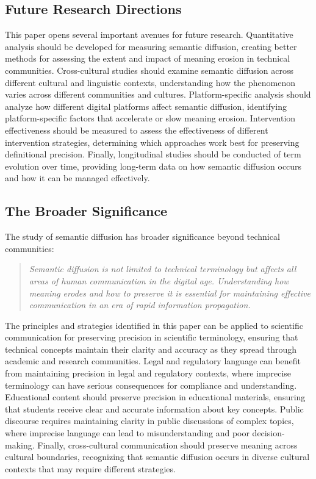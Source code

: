 \documentclass[11pt]{article}
\begin{document}
\subsection{Future Research Directions}

This paper opens several important avenues for future research. Quantitative analysis should be developed for measuring semantic diffusion, creating better methods for assessing the extent and impact of meaning erosion in technical communities. Cross-cultural studies should examine semantic diffusion across different cultural and linguistic contexts, understanding how the phenomenon varies across different communities and cultures. Platform-specific analysis should analyze how different digital platforms affect semantic diffusion, identifying platform-specific factors that accelerate or slow meaning erosion. Intervention effectiveness should be measured to assess the effectiveness of different intervention strategies, determining which approaches work best for preserving definitional precision. Finally, longitudinal studies should be conducted of term evolution over time, providing long-term data on how semantic diffusion occurs and how it can be managed effectively.

\subsection{The Broader Significance}

The study of semantic diffusion has broader significance beyond technical communities:

\begin{quote}
\emph{Semantic diffusion is not limited to technical terminology but affects all areas of human communication in the digital age. Understanding how meaning erodes and how to preserve it is essential for maintaining effective communication in an era of rapid information propagation.}
\end{quote}

The principles and strategies identified in this paper can be applied to scientific communication for preserving precision in scientific terminology, ensuring that technical concepts maintain their clarity and accuracy as they spread through academic and research communities. Legal and regulatory language can benefit from maintaining precision in legal and regulatory contexts, where imprecise terminology can have serious consequences for compliance and understanding. Educational content should preserve precision in educational materials, ensuring that students receive clear and accurate information about key concepts. Public discourse requires maintaining clarity in public discussions of complex topics, where imprecise language can lead to misunderstanding and poor decision-making. Finally, cross-cultural communication should preserve meaning across cultural boundaries, recognizing that semantic diffusion occurs in diverse cultural contexts that may require different strategies.
\end{document}
